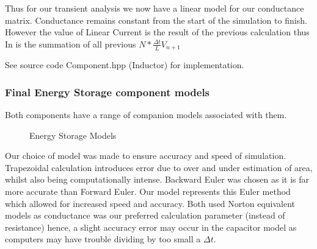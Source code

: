 \documentclass{article}
\begin{document}
Thus for our transient analysis we now have a linear model for our conductance matrix. Conductance remains constant from the start of the simulation to finish. However the value of Linear Current is the result of the previous calculation thus In is the summation of all previous $ N * \frac{\Delta t}{L}V_{n+1}$

\bigbreak

See source code Component.hpp (Inductor) for implementation.

\newpage

\subsubsection{Final Energy Storage component models}
Both components have a range of companion models associated with them. 

\begin{figure}[h]%
    \centering
    \qquad
    \caption{Energy Storage Models}%
    \label{fig:example}%
\end{figure}

Our choice of model was made to ensure accuracy and speed of simulation. Trapezoidal calculation introduces error due to over and under estimation of area, whilst also being computationally intense. Backward Euler was chosen as it is far more accurate than Forward Euler. Our model represents this Euler method which allowed for increased speed and accuracy. Both used Norton equivalent models as conductance was our preferred calculation parameter (instead of resistance) hence, a slight accuracy error may occur in the capacitor model as computers may have trouble dividing by too small a $\Delta t$.
\end{document}
